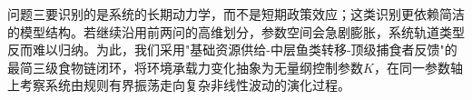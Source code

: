 问题三要识别的是系统的长期动力学，而不是短期政策效应；这类识别更依赖简洁的模型结构。若继续沿用前两问的高维划分，参数空间会急剧膨胀，系统轨道类型反而难以归纳。为此，我们采用"基础资源供给-中层鱼类转移-顶级捕食者反馈"的最简三级食物链闭环，将环境承载力变化抽象为无量纲控制参数$K$，在同一参数轴上考察系统由规则有界振荡走向复杂非线性波动的演化过程。